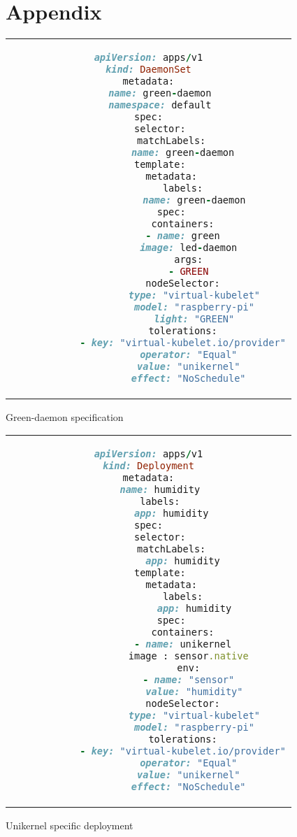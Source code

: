 \chapter{Appendix} \label{chapter: Appendix}

\begin{code}[htpb]
    \centering
    \begin{tabular}{c}
    \begin{lstlisting}[language=ruby]
apiVersion: apps/v1
kind: DaemonSet
metadata:
    name: green-daemon
    namespace: default
spec:
    selector:
        matchLabels:
            name: green-daemon
    template:
        metadata:
            labels:
                name: green-daemon
        spec:
            containers:
            - name: green
              image: led-daemon
              args:
              - GREEN
            nodeSelector:
                type: "virtual-kubelet"
                model: "raspberry-pi"
                light: "GREEN"
            tolerations:
            - key: "virtual-kubelet.io/provider"
              operator: "Equal"
              value: "unikernel"
              effect: "NoSchedule"
  \end{lstlisting}
  \end{tabular}
  \caption{Green-daemon specification}\label{fig:green-daemon}
  \end{code}


\begin{code}[htpb]
    \centering
    \begin{tabular}{c}
    \begin{lstlisting}[language=ruby]
apiVersion: apps/v1
kind: Deployment
metadata:
    name: humidity
    labels:
        app: humidity
spec:
    selector:
        matchLabels:
            app: humidity
    template:
        metadata:
            labels:
                app: humidity
        spec:
            containers:
            - name: unikernel
              image : sensor.native
              env:
              - name: "sensor"
                value: "humidity"
            nodeSelector:
                type: "virtual-kubelet"
                model: "raspberry-pi"
            tolerations:
            - key: "virtual-kubelet.io/provider"
              operator: "Equal"
              value: "unikernel"
              effect: "NoSchedule"
\end{lstlisting}
\end{tabular}
\caption{Unikernel specific deployment}\label{fig:unikernel-dep}
\end{code}

\iffalse
  \begin{figure}
    \centering
    \texttt{[image: rasp-running.jpeg]}
    \caption{Photo of wiring of \ref{fig:rpi-diagram}}\label{fig:wiring}
  \end{figure}
\fi